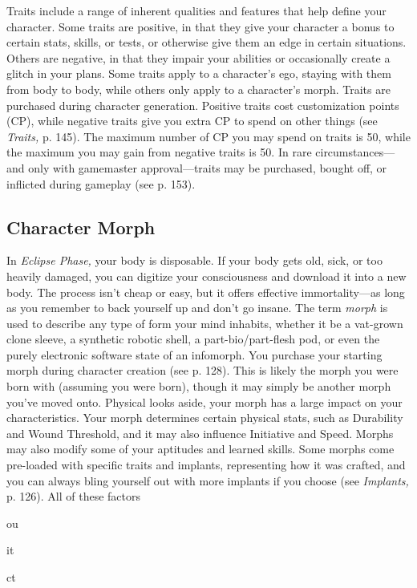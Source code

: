 Traits include a range of inherent qualities and features
that help define your character. Some traits are
positive, in that they give your character a bonus to 
certain stats, skills, or tests, or otherwise give them 
an edge in certain situations. Others are negative, in 
that they impair your abilities or occasionally create 
a glitch in your plans. Some traits apply to a character's
ego, staying with them from body to body, while
others only apply to a character's morph. 
Traits are purchased during character generation. 
Positive traits cost customization points (CP), while 
negative traits give you extra CP to spend on other 
things (see \textit{Traits,} p. 145). The maximum number of 
CP you may spend on traits is 50, while the maximum
you may gain from negative traits is 50. In rare
circumstances—and only with gamemaster approval—traits
may be purchased, bought off, or inflicted
during gameplay (see p. 153).

\subsection{Character Morph}

In \textit{Eclipse Phase,} your body is disposable. If your body 
gets old, sick, or too heavily damaged, you can digitize 
your consciousness and download it into a new body. 
The process isn't cheap or easy, but it offers effective 
immortality—as long as you remember to back yourself
up and don't go insane. The term \textit{morph }is used to
describe any type of form your mind inhabits, whether 
it be a vat-grown clone sleeve, a synthetic robotic shell, 
a part-bio/part-flesh pod, or even the purely electronic 
software state of an infomorph.
You purchase your starting morph during character 
creation (see p. 128). This is likely the morph you 
were born with (assuming you were born), though it 
may simply be another morph you've moved onto.
Physical looks aside, your morph has a large impact 
on your characteristics. Your morph determines certain 
physical stats, such as Durability and Wound Threshold, 
and it may also influence Initiative and Speed. Morphs 
may also modify some of your aptitudes and learned 
skills. Some morphs come pre-loaded with specific traits 
and implants, representing how it was crafted, and you 
can always bling yourself out with more implants if 
you choose (see \textit{Implants,} p. 126). All of these factors 

ou

it

ct 

